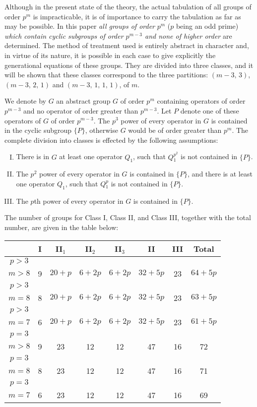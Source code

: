 \documentclass[oneside]{article}
\begin{document}
Although in the present state of the theory, the actual tabulation
of all groups of order $p^m$ is impracticable, it is of importance
to carry the tabulation as far as may be possible. In this paper
\textit{all groups of order} $p^m$ ($p$ being an odd prime)
\textit{which contain cyclic subgroups of order $p^{m-3}$ and none
of higher order} are determined. The method of treatment used is
entirely abstract in character and, in virtue of its nature, it is
possible in each case to give explicitly the generational
equations of these groups. They are divided into three classes,
and it will be shown that these classes correspond to the three
partitions: $(m-3,\, 3)$, $(m-3,\, 2,\, 1)$ and $(m-3,\, 1,\, 1,\, 1)$, of
$m$.

We denote by $G$ an abstract group $G$ of order $p^m$ containing
operators of order $p^{m-3}$ and no operator of order greater than
$p^{m-3}$. Let $P$ denote one of these operators of $G$ of order
$p^{m-3}$. The $p^3$ power of every operator in $G$ is contained
in the cyclic subgroup $\{P\}$, otherwise $G$ would be of order
greater than $p^m$. The complete division into classes is effected
by the following assumptions:
\begin{enumerate}[I.]
\item There is in $G$ at least one operator $Q_1$, such that
$Q{}_1^{p^2}$ is not contained in $\{P\}$.
\item The $p^2$ power of every operator in $G$ is contained in
$\{P\}$, and there is at least one operator $Q_1$, such that
$Q{}_1^p$ is not contained in $\{P\}$.
\item The $p$th power of every operator in $G$ is
contained in $\{P\}$.
\end{enumerate}

\newpage
The number of groups for Class I, Class II, and Class III,
together with the total number, are given in the table below:
\bigskip

\begin{tabular}{|c|c|c|c|c|c|c|c|}
\hline
 & I & II$_1$ & II$_2$ & II$_3$ & II & III & Total \\ \hline
$p>3$ & & & & & & & \\
$m>8$ & 9 & $20+p$ & $6+2p$ & $6+2p$ & $32+5p$ & 23 & $64+5p$ \\ \hline
$p>3$ & & & & & & & \\
$m=8$ & 8 & $20+p$ & $6+2p$ & $6+2p$ & $32+5p$ & 23 & $63+5p$ \\ \hline
$p>3$ & & & & & & & \\
$m=7$ & 6 & $20+p$ & $6+2p$ & $6+2p$ & $32+5p$ & 23 & $61+5p$ \\ \hline
$p=3$ & & & & & & & \\
$m>8$ & 9 & 23 & 12 & 12 & 47 & 16 & 72 \\ \hline
$p=3$ & & & & & & & \\
$m=8$ & 8 & 23 & 12 & 12 & 47 & 16 & 71 \\ \hline
$p=3$ & & & & & & & \\
$m=7$ & 6 & 23 & 12 & 12 & 47 & 16 & 69 \\ \hline
\end{tabular}
\end{document}
